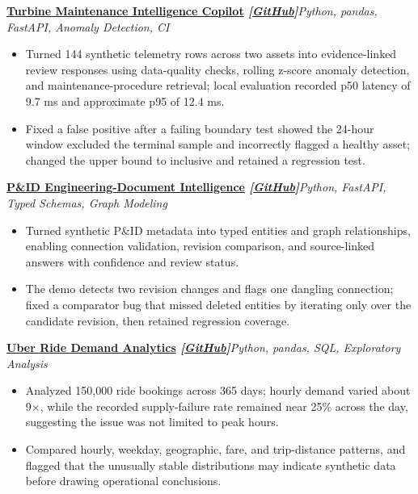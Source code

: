 \documentclass[10pt,a4paper]{article}
\newcommand{\resumeProject}[2]{%
  \textbf{#1}\hfill{\small\textit{#2}}\vspace{-3pt}
}
\begin{document}
\resumeProject
  {\href{https://nothing0g.github.io/analyst/projects/turbine-maintenance-copilot/}{Turbine Maintenance Intelligence Copilot}
  \hspace{3pt}\textnormal{\textbf{\textit{[\href{https://github.com/Nothing0g/turbine-maintenance-copilot}{GitHub}]}}}}
  {Python, pandas, FastAPI, Anomaly Detection, CI}
\begin{itemize}
  \item Turned 144 synthetic telemetry rows across two assets into evidence-linked review responses using data-quality checks, rolling z-score anomaly detection, and maintenance-procedure retrieval; local evaluation recorded p50 latency of 9.7 ms and approximate p95 of 12.4 ms.
  \item Fixed a false positive after a failing boundary test showed the 24-hour window excluded the terminal sample and incorrectly flagged a healthy asset; changed the upper bound to inclusive and retained a regression test.
\end{itemize}

\resumeProject
  {\href{https://nothing0g.github.io/analyst/projects/pid-engineering-document-intelligence/}{P\&ID Engineering-Document Intelligence}
  \hspace{3pt}\textnormal{\textbf{\textit{[\href{https://github.com/Nothing0g/pid-engineering-document-intelligence}{GitHub}]}}}}
  {Python, FastAPI, Typed Schemas, Graph Modeling}
\begin{itemize}
  \item Turned synthetic P\&ID metadata into typed entities and graph relationships, enabling connection validation, revision comparison, and source-linked answers with confidence and review status.
  \item The demo detects two revision changes and flags one dangling connection; fixed a comparator bug that missed deleted entities by iterating only over the candidate revision, then retained regression coverage.
\end{itemize}

\resumeProject
  {\href{https://nothing0g.github.io/analyst/projects/uber-ride-demand/}{Uber Ride Demand Analytics}
  \hspace{3pt}\textnormal{\textbf{\textit{[\href{https://github.com/Nothing0g/Uber_ride_demand_analysis}{GitHub}]}}}}
  {Python, pandas, SQL, Exploratory Analysis}
\begin{itemize}
  \item Analyzed 150,000 ride bookings across 365 days; hourly demand varied about 9$\times$, while the recorded supply-failure rate remained near 25\% across the day, suggesting the issue was not limited to peak hours.
  \item Compared hourly, weekday, geographic, fare, and trip-distance patterns, and flagged that the unusually stable distributions may indicate synthetic data before drawing operational conclusions.
\end{itemize}
\end{document}
